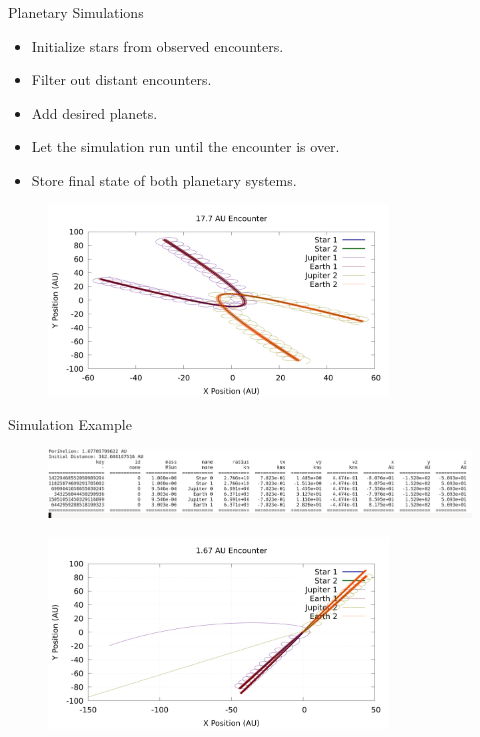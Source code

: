 \documentclass{beamer}
\begin{document}
\begin{frame}{Planetary Simulations}
    \begin{itemize}
        \item Initialize stars from observed encounters.
        \item Filter out distant encounters.
        \item Add desired planets.
        \item Let the simulation run until the encounter is over.
        \item Store final state of both planetary systems.
    \end{itemize}
    \begin{figure}
        \centering
        \includegraphics[height=2.00in]{17_7_AU}
    \end{figure}
\end{frame}

\begin{frame}{Simulation Example}
    \begin{figure}
        \centering
        \includegraphics[width=4.50in]{Params.png}
    \end{figure}
    \begin{figure}
        \centering
        \includegraphics[height=2.0in]{ejection.png}
    \end{figure}
\end{frame}
\end{document}
